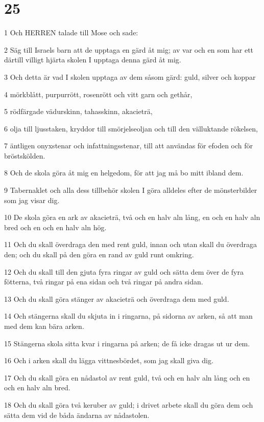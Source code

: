 \chapter{25}

\par 1 Och HERREN talade till Mose och sade:
\par 2 Säg till Israels barn att de upptaga en gärd åt mig; av var och en som har ett därtill villigt hjärta skolen I upptaga denna gärd åt mig.
\par 3 Och detta är vad I skolen upptaga av dem såsom gärd: guld, silver och koppar
\par 4 mörkblått, purpurrött, rosenrött och vitt garn och gethår,
\par 5 rödfärgade vädurskinn, tahasskinn, akacieträ,
\par 6 olja till ljusstaken, kryddor till smörjelseoljan och till den välluktande rökelsen,
\par 7 äntligen onyxstenar och infattningsstenar, till att användas för efoden och för bröstskölden.
\par 8 Och de skola göra åt mig en helgedom, för att jag må bo mitt ibland dem.
\par 9 Tabernaklet och alla dess tillbehör skolen I göra alldeles efter de mönsterbilder som jag visar dig.
\par 10 De skola göra en ark av akacieträ, två och en halv aln lång, en och en halv aln bred och en och en halv aln hög.
\par 11 Och du skall överdraga den med rent guld, innan och utan skall du överdraga den; och du skall på den göra en rand av guld runt omkring.
\par 12 Och du skall till den gjuta fyra ringar av guld och sätta dem över de fyra fötterna, två ringar på ena sidan och två ringar på andra sidan.
\par 13 Och du skall göra stänger av akacieträ och överdraga dem med guld.
\par 14 Och stängerna skall du skjuta in i ringarna, på sidorna av arken, så att man med dem kan bära arken.
\par 15 Stängerna skola sitta kvar i ringarna på arken; de få icke dragas ut ur dem.
\par 16 Och i arken skall du lägga vittnesbördet, som jag skall giva dig.
\par 17 Och du skall göra en nådastol av rent guld, två och en halv aln lång och en och en halv aln bred.
\par 18 Och du skall göra två keruber av guld; i drivet arbete skall du göra dem och sätta dem vid de båda ändarna av nådastolen.

